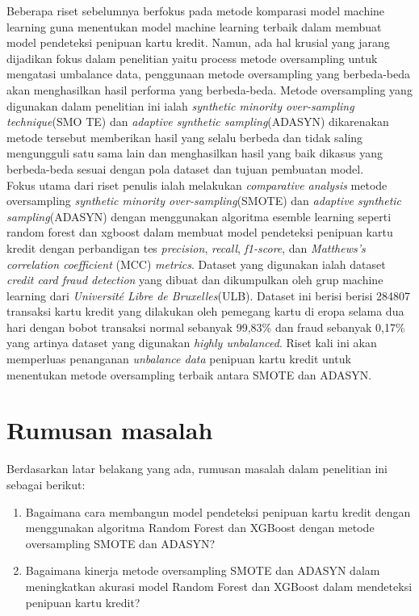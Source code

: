 Beberapa riset sebelumnya berfokus pada metode komparasi model machine learning guna menentukan model machine learning terbaik dalam membuat model pendeteksi penipuan kartu kredit\cite{mniai2023novel}. Namun, ada hal krusial yang jarang dijadikan fokus dalam penelitian yaitu process metode oversampling untuk mengatasi umbalance data, penggunaan metode oversampling yang berbeda-beda akan menghasilkan hasil performa yang berbeda-beda\cite{liu2004effect}. Metode oversampling yang digunakan dalam penelitian ini ialah \textit{synthetic minority over-sampling technique}(SMO
TE)\cite{chawla2002smote} dan \textit{adaptive synthetic sampling}(ADASYN)\cite{4633969} dikarenakan metode tersebut memberikan hasil yang selalu berbeda dan tidak saling mengungguli satu sama lain dan menghasilkan hasil yang baik dikasus yang berbeda-beda sesuai dengan pola dataset dan tujuan pembuatan model\cite{brandt2021comparative}.\\
Fokus utama dari riset penulis ialah melakukan \textit{comparative analysis} metode oversampling \textit{synthetic minority over-sampling}(SMOTE) dan \textit{adaptive synthetic sampling}(ADASYN) dengan menggunakan algoritma esemble learning seperti random forest dan xgboost dalam membuat model pendeteksi penipuan kartu kredit dengan perbandigan tes \textit{precision}, \textit{recall}, \textit{f1-score}, dan \textit{Matthews’s correlation coefficient} (MCC) \textit{metrics}. Dataset yang digunakan ialah dataset \textit{credit card fraud detection} yang dibuat dan dikumpulkan oleh grup machine learning dari \textit{Université Libre de Bruxelles}(ULB)\cite{dal2015calibrating}. Dataset ini berisi berisi 284807 transaksi kartu kredit yang dilakukan oleh pemegang kartu di  eropa  selama  dua  hari  dengan bobot  transaksi  normal  sebanyak  99,83\%  dan  fraud  sebanyak  0,17\% yang artinya dataset yang digunakan \textit{highly unbalanced}\cite{WinNT}. 
Riset kali ini akan memperluas penanganan \textit{unbalance data} penipuan kartu kredit untuk menentukan metode oversampling terbaik antara SMOTE dan ADASYN.

\section{Rumusan masalah} \label{I.Rumusan Masalah}
Berdasarkan latar belakang yang ada, rumusan masalah dalam penelitian ini sebagai berikut:

\begin{enumerate}[noitemsep]
        \item Bagaimana cara membangun model pendeteksi penipuan kartu kredit dengan menggunakan algoritma Random Forest dan XGBoost dengan metode oversampling SMOTE dan ADASYN?
        \item Bagaimana kinerja metode oversampling SMOTE dan ADASYN dalam meningkatkan akurasi model Random Forest dan XGBoost dalam mendeteksi penipuan kartu kredit?
\end{enumerate}

